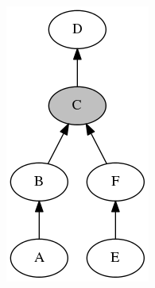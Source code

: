 \begin{figure}[H]
{\begin{subfigure}[b]{0.2\textwidth}
        \end{subfigure}
        \begin{subfigure}[b]{0.2\textwidth}
            \includegraphics[width=\textwidth]{./figures/methodology/spatial_time_correlation/event_tree_graph_2.png}
            \caption{}\label{fig:network_events_locations_examples_2}

\end{subfigure}}
\end{figure}
